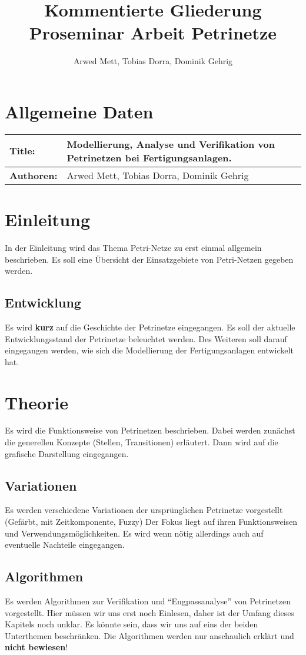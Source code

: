 \documentclass{article}
\author{Arwed Mett, Tobias Dorra, Dominik Gehrig}
\title{Kommentierte Gliederung Proseminar Arbeit Petrinetze}
\begin{document}
\maketitle

\section{Allgemeine Daten}
\begin{tabularx}{\textwidth}{|X|X|}
    \hline
    \textbf{Title:} & Modellierung, Analyse und Verifikation von Petrinetzen bei Fertigungsanlagen.\\
    \hline
    \textbf{Authoren:} & Arwed Mett, Tobias Dorra, Dominik Gehrig\\
    \hline
\end{tabularx}
\section{Einleitung}
In der Einleitung wird das Thema Petri-Netze zu erst einmal allgemein beschrieben.
Es soll eine Übersicht der Einsatzgebiete von Petri-Netzen gegeben werden.

\subsection{Entwicklung}
Es wird \textbf{kurz} auf die Geschichte der Petrinetze eingegangen.
Es soll der aktuelle Entwicklungsstand der Petrinetze beleuchtet werden.
Des Weiteren soll darauf eingegangen werden, wie sich die Modellierung der Fertigungsanlagen entwickelt hat.
\section{Theorie} 
Es wird die Funktionsweise von Petrinetzen beschrieben.
Dabei werden zunächst die generellen Konzepte (Stellen, Transitionen) erläutert.
Dann wird auf die grafische Darstellung eingegangen.

\subsection{Variationen}
Es werden verschiedene Variationen der ursprünglichen Petrinetze vorgestellt (Gefärbt, mit Zeitkomponente, Fuzzy)
Der Fokus liegt auf ihren Funktionsweisen und Verwendungsmöglichkeiten.
Es wird wenn nötig allerdings auch auf eventuelle Nachteile eingegangen. 

\subsection{Algorithmen}
Es werden Algorithmen zur Verifikation und "`Engpassanalyse"' von Petrinetzen vorgestellt.
Hier müssen wir uns erst noch Einlesen, daher ist der Umfang dieses Kapitels noch unklar. Es könnte sein, dass wir uns auf eins der beiden Unterthemen beschränken.
Die Algorithmen werden nur anschaulich erklärt und \textbf{nicht bewiesen}!
\end{document}
